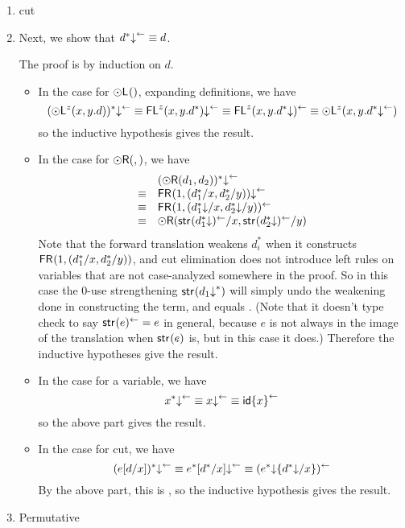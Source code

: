 \begin{enumerate}
\begin{itemize}
\end{itemize}

\item cut

\item Next, we show that ${d^*\mathord{\downarrow}}^{\leftarrow} \equiv d$.  

The proof is by induction on $d$.  

\begin{itemize}
\item In the case for $\mathord{\odot}\mathsf{L}^{}()$, expanding definitions, we have
\[
(\mathord{\odot}\mathsf{L}^{z}(x,y.d))^*\mathord{\downarrow}^{\leftarrow} \equiv
\mathsf{FL}^{z}(x,y.d^*)\mathord{\downarrow}^{\leftarrow} \equiv 
\mathsf{FL}^{z}(x,y.d^*\mathord{\downarrow})^{\leftarrow} \equiv
{\ensuremath{\mathord{\odot}}\ensuremath{\mathsf{L}}^{z}(x,y.\ensuremath{d^*\mathord{\downarrow}^{\leftarrow}})}
\]
so the inductive hypothesis gives the result.  

\item In the case for $\mathord{\odot}\mathsf{R}(,)$, we have
\[
\begin{array}{ll}
& (\mathord{\odot}\mathsf{R}(d_1,d_2))^*\mathord{\downarrow}^{\leftarrow} \\
\equiv & \mathsf{FR}_{}(1,(d_1^*/x,d_2^*/y))\mathord{\downarrow}^{\leftarrow} \\
\equiv & \mathsf{FR}_{}(1,(d_1^*\mathord{\downarrow}/x,d_2^*\mathord{\downarrow}/y))^{\leftarrow} \\
\equiv & \mathord{\odot}\mathsf{R}(\mathsf{str}_{}(d_1^*\mathord{\downarrow})^{\leftarrow}/x,\mathsf{str}_{}(d_2^*\mathord{\downarrow})^{\leftarrow}/y)
\end{array}
\]
Note that the forward translation weakens $d_i^*$ when it constructs 
${\mathsf{FR}_{}(1,(d_1^*/x,d_2^*/y))}$, and cut elimination does not introduce
left rules on variables that are not case-analyzed somewhere in the
proof.  
So in this case the 0-use strengthening $\mathsf{str}_{}(d_1\mathord{\downarrow}^*)$ will
simply undo the weakening done in constructing the term, and
 equals .  (Note
that it doesn't type check to say $\mathsf{str}_{}(e)^{\leftarrow} = e$ in general,
because $e$ is not always in the image of the translation when
$\mathsf{str}_{}(e)$ is, but in this case it does.)  Therefore the inductive
hypotheses give the result.  

\item In the case for a variable, we have
\[
x^*\mathord{\downarrow}^{\leftarrow} \equiv x\mathord{\downarrow}^{\leftarrow} \equiv {\ensuremath{\mathsf{id}}\{x\}}^{\leftarrow}
\]
so the above part gives the result.  

\item In the case for cut, we have
\[
(e[d/x])^*\mathord{\downarrow}^{\leftarrow} \equiv e^*[d^*/x]\mathord{\downarrow}^{\leftarrow}
\equiv (e^*\mathord{\downarrow}\{d^*\mathord{\downarrow}/x\})^{\leftarrow}
\]
By the above part, this is 
, 
so the inductive hypothesis gives the result.  

\end{itemize}

\item Permutative

\end{enumerate}
